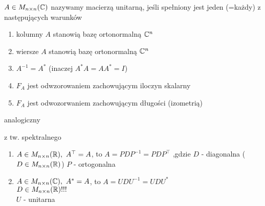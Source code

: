 \begin{df}[twierdzenie] 
  $A \in M_{n \times n}(\mathbb{C})$ nazywamy macierzą unitarną, jeśli spełniony jest 
  jeden (=każdy) z następujących warunków
  \begin{enumerate}[(1)] 
    \item kolumny $A$ stanowią bazę ortonormalną $\mathbb{C}^n$
    \item wiersze $A$ stanowią bazę ortonormalną $\mathbb{C}^n$
    \item $A^{-1} = A^*$ (inaczej $A^* A = AA^* = I$)
    \item $F_A$ jest odwzorowaniem zachowującym iloczyn skalarny
    \item $F_A$ jest odwozorwaniem zachowującym długości (izometrią)
  \end{enumerate} 
\end{df} 
\begin{dd} analogiczny \end{dd} 
\begin{wn}{z tw. spektralnego} \hfill 
  \begin{enumerate}[(1)] 
    \item $A \in M_{n \times n}(\mathbb{R}),\ A^\top = A$, to $A = PDP^{-1} = PDP^\top$ 
    ,gdzie $D$ - diagonalna ($D \in M_{n \times n}(\mathbb{R})$) 
    $P$ - ortogonalna
    \item $A \in M_{n \times n}(\mathbb{C}),\ A^* = A$, to $A = UDU^{-1} = UDU^*$ \\ 
    $D \in M_{n \times n}(\mathbb{R}) !!!$ \\ 
    $U$ - unitarna 
  \end{enumerate} 
\end{wn} 

